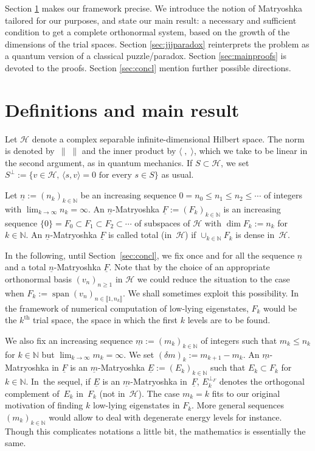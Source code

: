 \documentclass[pdftex]{sigma}%
\DeclareMathOperator{\psan}{span}
\newcommand{\hilH}{\mathcal H}
\newcommand{\norm}[1]{\lVert #1\rVert}
\newcommand{\aver}[1]{\langle #1 \rangle}
\newcommand{\kN}{k\in \mathbb{N}}
\newcommand{\intt}[1]{\llbracket #1 \rrbracket}
\newcommand{\perpF}{{\perp _F}}
\begin{document}
Section \ref{sec:defmainres} makes our framework precise. We introduce the notion of Matryoshka tailored for our purposes, and state our main result: a necessary and sufficient condition to get a complete orthonormal system, based on the growth of the dimensions of the trial spaces. Section \ref{sec:jjjparadox} reinterprets the problem as a quantum version of a classical puzzle/paradox. Section \ref{sec:mainproofs} is devoted to the proofs. Section \ref{sec:concl} mention further possible directions.

\section{Definitions and main result} \label{sec:defmainres}

Let $\hilH$ denote a complex separable infinite-dimensional Hilbert space. The norm is denoted by~$\norm{\;}$ and the inner product by $\aver{\; , \;}$, which we take to be linear in the second argument, as in quantum mechanics. If $S \subset \hilH$, we set $S^\perp:=\{v\in \hilH, \, \aver{s , v}=0 \text{ for every } s\in S\}$ as usual.

Let $\underline{n}:=(n_k)_{\kN}$ be an increasing sequence $0=n_0 \leq n_1\leq n_2\leq\cdots $ of integers with \mbox{$\lim_{k\to \infty}n_k=\infty$}.
An $\underline{n}$-Matryoshka $\underline{F}:=(F_k)_{\kN}$ is an increasing sequence $\{0\}=F_0\subset F_1\subset F_2\subset\cdots$ of subspaces of $\hilH$ with $\dim F_k:=n_k$ for $\kN$.
An $\underline{n}$-Matryoshka $\underline{F}$ is called total (in~$\hilH$) if $\cup_{\kN} F_k$ is dense in~$\hilH$.

In the following, until Section~\ref{sec:concl}, we fix once and for all the sequence $\underline{n}$ and a total $\underline{n}$-Mat\-ryoshka $\underline{F}$. Note that by the choice of an appropriate orthonormal basis $(v_n)_{n\geq 1}$ in $\hilH$ we could reduce the situation to the case when $F_k:=\psan (v_n)_{n\in \intt{1,n_k}}$. We shall sometimes exploit this possibility.
In the framework of numerical computation of low-lying eigenstates, $F_k$ would be the $k^{\text{th}}$ trial space, the space in which the first $k$ levels are to be found.

We also fix an increasing sequence $\underline{m}:=(m_k)_{\kN}$ of integers such that $m_k\leq n_k$ for $\kN$ but $\lim_{k\to \infty}m_k=\infty$. We set $(\delta m)_k:=m_{k+1}-m_k$.
An $\underline{m}$-Matryoshka in $\underline{F}$ is an $\underline{m}$-Matryoshka $\underline{E}:=(E_k)_{\kN}$ such that $E_k \subset F_k$ for $\kN$. In~the sequel, if $\underline{E}$ is an $\underline{m}$-Matryoshka in~$\underline{F}$, $E_k^\perpF$ denotes the orthogonal complement of~$E_k$ in~$F_k$ (not in~$\hilH$).
The case $m_k=k$ fits to our original motivation of finding $k$ low-lying eigenstates in $F_k$. More general sequences $(m_k)_{\kN}$ would allow to deal with degenerate energy levels for instance. Though this complicates notations a little bit, the mathematics is essentially the same.
\end{document}
